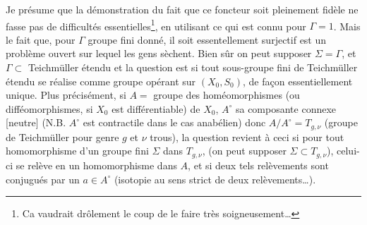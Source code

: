 Je présume que la démonstration du fait que ce foncteur soit pleinement fidèle ne fasse pas de difficultés essentielles\footnote{Ca vaudrait drôlement le coup de le faire très soigneusement\dots}, en utilisant ce qui est connu pour $\Gamma = 1$. Mais le fait que, pour $\Gamma$ groupe fini donné, il soit essentellement surjectif est un problème ouvert sur lequel les gens sèchent. Bien sûr on peut supposer $\Sigma = \Gamma$, et $\Gamma \subset $ Teichmüller étendu et la question est si tout sous-groupe fini de Teichmüller étendu se réalise comme groupe opérant sur $(X_0, S_0)$, de fa\c{c}on essentiellement unique. Plus précisément, si $A =$ groupe des homéomorphismes (ou difféomorphismes, si $X_0$ est différentiable) de $X_0$, $A^\circ$ sa composante connexe [neutre] (N.B. $A^\circ$ est contractile dans le cas anabélien) donc $A/A^\circ = T_{g, \nu}$ (groupe de Teichmüller pour genre $g$ et $\nu$ trous), la question revient à ceci si pour tout homomorphisme d'un groupe fini $\Sigma$ dans $T_{g, \nu}$, (on peut supposer $\Sigma \subset  T_{g, \nu}$), celui-ci se relève en un homomorphisme dans $A$, et si deux tels relèvements sont conjugués par un $a \in A^\circ$ (isotopie au sens strict de deux relèvements\dots).

